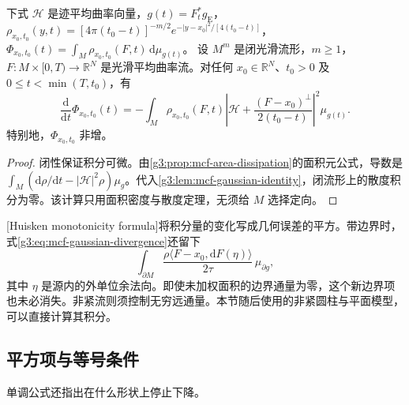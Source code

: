 \begin{theorem}\label{g3:thm:huisken-monotonicity}
	下式 \(\mathcal H\) 是迹平均曲率向量，\(g(t)=F_t^*g_{\mathrm E}\)，\(\rho_{x_0,t_0}(y,t)=[4\pi(t_0-t)]^{-m/2}e^{-|y-x_0|^2/[4(t_0-t)]}\)，\(\Phi_{x_0,t_0}(t)=\int_M\rho_{x_0,t_0}(F,t)\,\mathrm d\mu_{g(t)}\)。
	设 \(M^m\) 是闭光滑流形，\(m\ge1\)，\(F:M\times[0,T)\to\mathbb R^N\) 是光滑平均曲率流。对任何 \(x_0\in\mathbb R^N\)、\(t_0>0\) 及 \(0\le t<\min(T,t_0)\)，有
	\begin{equation}\label{g3:eq:huisken-monotonicity}
		\frac{\mathrm d}{\mathrm dt}\Phi_{x_0,t_0}(t)
		=-\int_M\rho_{x_0,t_0}(F,t)
		\left|\mathcal H+\frac{(F-x_0)^\perp}{2(t_0-t)}\right|^2\mu_{g(t)}.
	\end{equation}
	特别地，\(\Phi_{x_0,t_0}\) 非增。
\end{theorem}
\begin{proof}
	闭性保证积分可微。由\cref{g3:prop:mcf-area-dissipation}的面积元公式，导数是
	\(\int_M(\mathrm d\rho/\mathrm dt-|\mathcal H|^2\rho)\mu_g\)。代入\cref{g3:lem:mcf-gaussian-identity}，闭流形上的散度积分为零。该计算只用面积密度与散度定理，无须给 \(M\) 选择定向。
\end{proof}

[Huisken monotonicity formula]将积分量的变化写成几何误差的平方。带边界时，式\eqref{g3:eq:mcf-gaussian-divergence}还留下
\[
	\int_{\partial M}\frac{\rho\langle F-x_0,\mathrm dF(\eta)\rangle}{2\tau}\,\mu_{\partial g},
\]
其中 \(\eta\) 是源内的外单位余法向。即使未加权面积的边界通量为零，这个新边界项也未必消失。非紧流则须控制无穷远通量。本节随后使用的非紧圆柱与平面模型，可以直接计算其积分。

\subsection{平方项与等号条件}
\label{g3:subsec:2803:03}
单调公式还指出在什么形状上停止下降。

